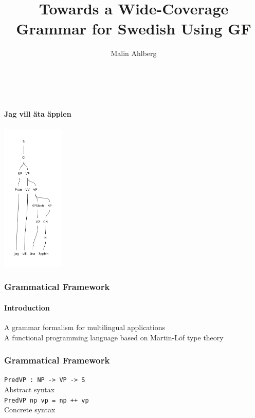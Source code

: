 \documentclass[10pt]{beamer}
\title{Towards a Wide-Coverage Grammar for Swedish Using GF}
\author{Malin Ahlberg}
\date{}
\begin{document}
\maketitle

\begin{frame}
    \frametitle{~ }
\framesubtitle{Jag vill äta äpplen}
\includegraphics[width=30mm]{parse.pdf}
 \end{frame}


 \begin{frame}
  \frametitle{Grammatical Framework}
  \framesubtitle{Introduction}
  A grammar formalism for multilingual applications\\
  \pause
  \vspace{5mm}
  A functional programming language  based on Martin-Löf type theory\\
 \end{frame}


\begin{frame}[containsverbatim]
  \frametitle{Grammatical Framework}
  \verb|PredVP : NP -> VP -> S|\\
  Abstract syntax\\
  \vspace{5mm}
  \verb|PredVP np vp = np ++ vp |\\
  Concrete syntax
 \end{frame}
\end{document}
